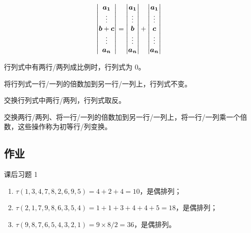 \begin{property}
	$$
	\begin{vmatrix}
		\boldsymbol{a_1} \\
		\vdots \\
		\boldsymbol{b}+\boldsymbol{c} \\
		\vdots \\
		\boldsymbol{a_n}
	\end{vmatrix} =
	\begin{vmatrix}
		\boldsymbol{a_1} \\
		\vdots \\
		\boldsymbol{b} \\
		\vdots \\
		\boldsymbol{a_n}
	\end{vmatrix} +
	\begin{vmatrix}
		\boldsymbol{a_1} \\
		\vdots \\
		\boldsymbol{c} \\
		\vdots \\
		\boldsymbol{a_n}
	\end{vmatrix}
	$$
\end{property}

\begin{property}
	行列式中有两行/两列成比例时，行列式为 $0$。
\end{property}

\begin{property}
	将行列式一行/一列的倍数加到另一行/一列上，行列式不变。
\end{property}

\begin{property}
	交换行列式中两行/两列，行列式取反。
\end{property}

交换两行/两列、将一行/一列的倍数加到另一行/一列上，将一行/一列乘一个倍数，这些操作称为初等行/列变换。

\subsection{作业}

\begin{problem}
	课后习题 1
	\begin{solution}
		\begin{enumerate}
			\item $\tau(1,3,4,7,8,2,6,9,5) = 4 + 2 + 4 = 10$，是偶排列；
			\item $\tau(2,1,7,9,8,6,3,5,4) = 1 + 1 + 3 + 4 + 4 + 5 = 18$，是偶排列；
			\item $\tau(9,8,7,6,5,4,3,2,1) = 9 \times 8 / 2 = 36$，是偶排列。
		\end{enumerate}
	\end{solution}
\end{problem}

